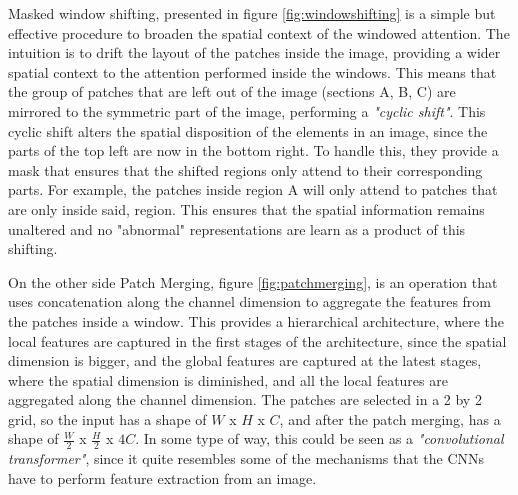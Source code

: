 Masked window shifting, presented in figure \ref{fig:windowshifting} is a simple but effective procedure to broaden the spatial context of the windowed attention. The intuition is to drift the layout of the patches inside the image, providing a wider spatial context to the attention performed inside the windows. This means that the group of patches that are left out of the image (sections A, B, C) are mirrored to the symmetric part of the image, performing a \textit{"cyclic shift"}. This cyclic shift alters the spatial disposition of the elements in an image, since the parts of the top left are now in the bottom right. To handle this, they provide a mask that ensures that the shifted regions only attend to their corresponding parts. For example, the patches inside region A will only attend to patches that are only inside said, region. This ensures that the spatial information remains unaltered and no "abnormal" representations are learn as a product of this shifting. 

On the other side Patch Merging, figure \ref{fig:patchmerging}, is an operation that uses concatenation along the channel dimension to aggregate the features from the patches inside a window. This provides a hierarchical architecture, where the local features are captured in the first stages of the architecture, since the spatial dimension is bigger, and the global features are captured at the latest stages, where the spatial dimension is diminished, and all the local features are aggregated along the channel dimension. The patches are selected in a 2 by 2 grid, so the input has a shape of $W$ x $H$ x $C$, and after the patch merging, has a shape of $\frac{W}{2}$ x $\frac{H}{2}$ x $4C$. In some type of way, this could be seen as a \textit{"convolutional transformer"}, since it quite resembles some of the mechanisms that the CNNs have to perform feature extraction from an image. 

